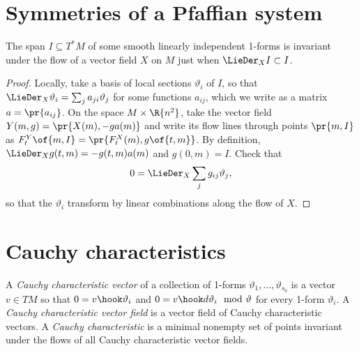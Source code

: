 \section{Symmetries of a Pfaffian system}
\begin{lemma}\label{lemma:symmetries}
The span \(I \subseteq T^*M\) of some smooth linearly independent 1-forms is invariant under the flow of a vector field \(X\) on \(M\) just when \(\LieDer_X I \subset I\).
\end{lemma}
\begin{proof}
Locally, take a basis of local sections \(\vartheta_i\) of \(I\), so that \(\LieDer_X \vartheta_i = \sum_j a_{ji} \vartheta_j\) for some functions \(a_{ij}\), which we write as a matrix \(a=\pr{a_{ij}}\).
On the space \(M \times \R{n^2}\), take the vector field \(Y(m,g)=\pr{X(m),-ga(m)}\) and write its flow lines through points \(\pr{m,I}\) as \(F^Y_t\of{m,I}=\pr{F^X_t(m),g\of{t,m}}\).
By definition, \(\LieDer_X g(t,m)=-g(t,m)a(m)\) and \(g(0,m)=I\).
Check that
\[
0 = \LieDer_X \sum_j g_{ij} \vartheta_j,
\]
so that the \(\vartheta_i\) transform by linear combinations along the flow of \(X\).
\end{proof}






\section{Cauchy characteristics}
A \emph{Cauchy characteristic vector} of a collection of 1-forms \(\vartheta_1,\dots,\vartheta_{s_0}\) is a vector \(v \in TM\) so that \(0=v \hook \vartheta_i\) and \(0=v \hook d\vartheta_i \mod{\vartheta}\) for every 1-form \(\vartheta_i\).
A \emph{Cauchy characteristic vector field} is a vector field of Cauchy characteristic vectors.
A \emph{Cauchy characteristic} is a minimal nonempty set of points invariant under the flows of all Cauchy characteristic vector fields.


